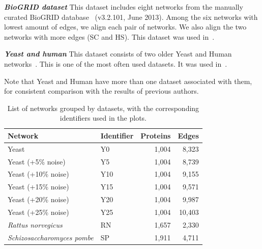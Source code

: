\documentclass{bioinfo}
\begin{document}
\emph{\textbf{BioGRID dataset}} This dataset includes eight networks from the manually curated BioGRID database~\citep{Chatr-aryamontri01012013} (v3.2.101, June 2013). Among the six networks with lowest amount of edges, we align each pair of networks. We also align the two networks with more edges (SC and HS). This dataset was used in~\cite{LGRAAL}.

\emph{\textbf{Yeast and human}} This dataset consists of two older Yeast and Human networks~\citep{Collins01032007,humanNetwork}. This is one of the most often used datasets. It was used in~\citep{GRAAL,NETAL,MAGNA,MIGRAAL}. 

Note that Yeast and Human have more than one dataset associated with them, for consistent comparison with the results of previous authors.
\begin{table}[h]
\label{networkTable}
\caption{List of networks grouped by datasets, with the corresponding identifiers used in the plots.}
\begin{tabular}{llrr}
\hline
\textbf{Network}                   & \textbf{Identifier} & \multicolumn{1}{l}{\textbf{Proteins}} & \multicolumn{1}{l}{\textbf{Edges}} \\ \hline
Yeast                              & Y0                  & 1,004                                 & 8,323                                     \\
Yeast (+5\% noise)                 & Y5                  & 1,004                                 & 8,739                                     \\
Yeast (+10\% noise)                & Y10                 & 1,004                                 & 9,155                                     \\
Yeast (+15\% noise)                & Y15                 & 1,004                                 & 9,571                                     \\
Yeast (+20\% noise)                & Y20                 & 1,004                                 & 9,987                                     \\
Yeast (+25\% noise)                & Y25                 & 1,004                                 & 10,403                                    \\ \hline
\textit{Rattus norvegicus}         & RN                  & 1,657                                 & 2,330                                     \\
\textit{Schizosaccharomyces pombe} & SP                  & 1,911                                 & 4,711                                     \\

\end{tabular}
\end{table}
\end{document}
